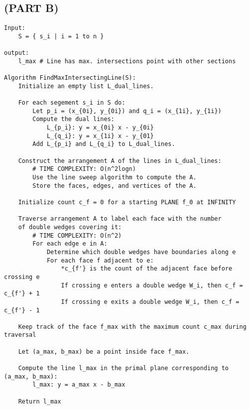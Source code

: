 \documentclass{article}
\begin{document}
\subsection*{(PART B)}
\begin{verbatim}
Input:
    S = { s_i | i = 1 to n }

output:
    l_max # Line has max. intersections point with other sections

Algorithm FindMaxIntersectingLine(S): 
    Initialize an empty list L_dual_lines.

    For each segement s_i in S do:
        Let p_i = (x_{0i}, y_{0i}) and q_i = (x_{1i}, y_{1i})
        Compute the dual lines:
            L_{p_i}: y = x_{0i} x - y_{0i}
            L_{q_i}: y = x_{1i} x - y_{01}
        Add L_{p_i} and L_{q_i} to L_dual_lines.

    Construct the arrangement A of the lines in L_dual_lines:
        # TIME COMPLEXITY: O(n^2logn)
        Use the line sweep algorithm to compute the A.
        Store the faces, edges, and vertices of the A.

    Initialize count c_f = 0 for a starting PLANE f_0 at INFINITY

    Traverse arrangement A to label each face with the number 
    of double wedges covering it: 
        # TIME COMPLEXITY: O(n^2)
        For each edge e in A:
            Determine which double wedges have boundaries along e
            For each face f adjacent to e:
                *c_{f'} is the count of the adjacent face before crossing e
                If crossing e enters a double wedge W_i, then c_f = c_{f'} + 1
                If crossing e exits a double wedge W_i, then c_f = c_{f'} - 1
    
    Keep track of the face f_max with the maximum count c_max during traversal
    
    Let (a_max, b_max) be a point inside face f_max.

    Compute the line l_max in the primal plane corresponding to (a_max, b_max):
        l_max: y = a_max x - b_max

    Return l_max

\end{verbatim}

\newpage
\end{document}
